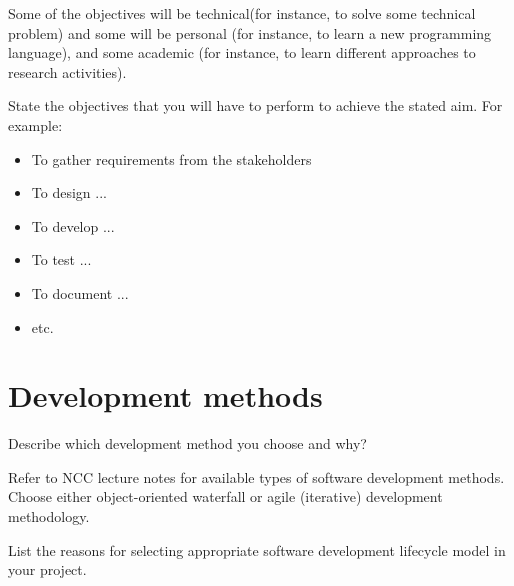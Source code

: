 Some of the objectives will be technical(for instance, to solve some technical problem) and some will be personal (for instance, to learn a new programming language), and some academic (for instance, to learn different approaches to research activities).

State the objectives that you will have to perform to achieve the stated aim. For example:
\begin{itemize}
  \item To gather requirements from the stakeholders
  \item To design ...
  \item To develop ...
  \item To test ...
  \item To document ...
  \item etc.
\end{itemize}

\section{Development methods} %
\label{sec:development_methods}
Describe which development method you choose and why?

Refer to NCC lecture notes for available types of software development methods. Choose either object-oriented waterfall or agile (iterative) development methodology.

List the reasons for selecting appropriate software development lifecycle model in your project.

